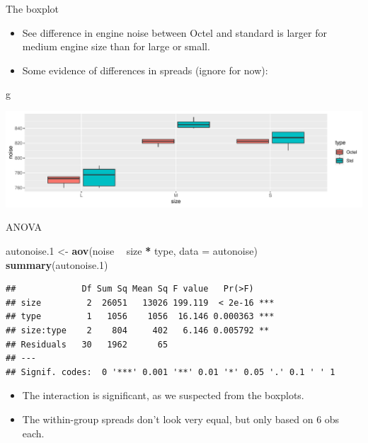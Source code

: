 \documentclass[
  ignorenonframetext,
]{beamer}
\newenvironment{Shaded}{\begin{snugshade}}{\end{snugshade}}
\newcommand{\DataTypeTok}[1]{\textcolor[rgb]{0.13,0.29,0.53}{#1}}
\newcommand{\FloatTok}[1]{\textcolor[rgb]{0.00,0.00,0.81}{#1}}
\newcommand{\KeywordTok}[1]{\textcolor[rgb]{0.13,0.29,0.53}{\textbf{#1}}}
\newcommand{\NormalTok}[1]{#1}
\newcommand{\OperatorTok}[1]{\textcolor[rgb]{0.81,0.36,0.00}{\textbf{#1}}}
\newcommand{\StringTok}[1]{\textcolor[rgb]{0.31,0.60,0.02}{#1}}
\begin{document}
\begin{frame}[fragile]{The boxplot}
\protect\hypertarget{the-boxplot}{}

\begin{itemize}
\item
  See difference in engine noise between Octel and standard is larger
  for medium engine size than for large or small.
\item
  Some evidence of differences in spreads (ignore for now):
\end{itemize}

\begin{Shaded}
\begin{Highlighting}[]
\NormalTok{g}
\end{Highlighting}
\end{Shaded}

\includegraphics{slides_d29_files/figure-beamer/unnamed-chunk-212-1.pdf}

\end{frame}

\begin{frame}[fragile]{ANOVA}
\protect\hypertarget{anova}{}

\small

\begin{Shaded}
\begin{Highlighting}[]
\NormalTok{autonoise}\FloatTok{.1}\NormalTok{ <-}\StringTok{ }\KeywordTok{aov}\NormalTok{(noise }\OperatorTok{~}\StringTok{ }\NormalTok{size }\OperatorTok{*}\StringTok{ }\NormalTok{type, }\DataTypeTok{data =}\NormalTok{ autonoise)}
\KeywordTok{summary}\NormalTok{(autonoise}\FloatTok{.1}\NormalTok{)}
\end{Highlighting}
\end{Shaded}

\begin{verbatim}
##             Df Sum Sq Mean Sq F value   Pr(>F)    
## size         2  26051   13026 199.119  < 2e-16 ***
## type         1   1056    1056  16.146 0.000363 ***
## size:type    2    804     402   6.146 0.005792 ** 
## Residuals   30   1962      65                     
## ---
## Signif. codes:  0 '***' 0.001 '**' 0.01 '*' 0.05 '.' 0.1 ' ' 1
\end{verbatim}

\normalsize

\begin{itemize}
\item
  The interaction is significant, as we suspected from the boxplots.
\item
  The within-group spreads don't look very equal, but only based on 6
  obs each.
\end{itemize}

\end{frame}
\end{document}
